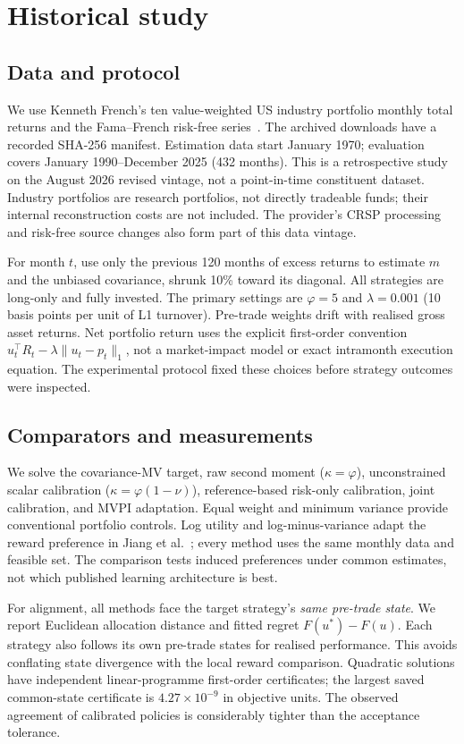 \documentclass[sigconf,anonymous,review]{acmart}
\begin{document}
\section{Historical study}
\subsection{Data and protocol}
We use Kenneth French's ten value-weighted US industry portfolio monthly total returns and the Fama--French risk-free series\ \cite{french}. The archived downloads have a recorded SHA-256 manifest. Estimation data start January 1970; evaluation covers January 1990--December 2025 (432 months). This is a retrospective study on the August 2026 revised vintage, not a point-in-time constituent dataset. Industry portfolios are research portfolios, not directly tradeable funds; their internal reconstruction costs are not included. The provider's CRSP processing and risk-free source changes also form part of this data vintage.

For month $t$, use only the previous 120 months of excess returns to estimate $m$ and the unbiased covariance, shrunk 10\% toward its diagonal. All strategies are long-only and fully invested. The primary settings are $\varphi=5$ and $\lambda=0.001$ (10 basis points per unit of L1 turnover). Pre-trade weights drift with realised gross asset returns. Net portfolio return uses the explicit first-order convention $u_t^\top R_t-\lambda\|u_t-p_t\|_1$, not a market-impact model or exact intramonth execution equation. The experimental protocol fixed these choices before strategy outcomes were inspected.

\subsection{Comparators and measurements}
We solve the covariance-MV target, raw second moment ($\kappa=\varphi$), unconstrained scalar calibration ($\kappa=\varphi(1-\nu)$), reference-based risk-only calibration, joint calibration, and MVPI adaptation. Equal weight and minimum variance provide conventional portfolio controls. Log utility and log-minus-variance adapt the reward preference in Jiang et al.\ \cite{jiang2025}; every method uses the same monthly data and feasible set. The comparison tests induced preferences under common estimates, not which published learning architecture is best.

For alignment, all methods face the target strategy's \emph{same pre-trade state}. We report Euclidean allocation distance and fitted regret $F(u^*)-F(u)$. Each strategy also follows its own pre-trade states for realised performance. This avoids conflating state divergence with the local reward comparison. Quadratic solutions have independent linear-programme first-order certificates; the largest saved common-state certificate is $4.27\times10^{-9}$ in objective units. The observed agreement of calibrated policies is considerably tighter than the acceptance tolerance.
\end{document}
